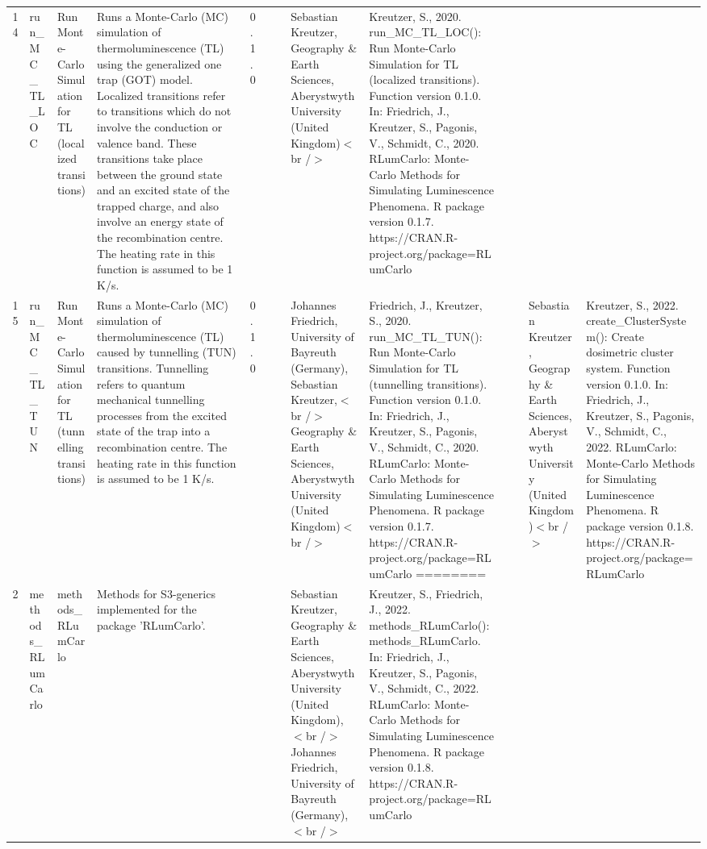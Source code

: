 \begin{table}[ht]
\begin{tabular}{rllllllll}
 \\ 
  14 & run\_MC\_TL\_LOC & Run Monte-Carlo Simulation for TL (localized transitions) & Runs a Monte-Carlo (MC) simulation of thermoluminescence (TL) using the generalized one trap (GOT) model. Localized transitions refer to transitions which do not involve the conduction or valence band. These transitions take place between the ground state and an excited state of the trapped charge, and also involve an energy state of the recombination centre. The heating rate in this function is assumed to be 1 K/s. & 0.1.0
 &  &  & Sebastian Kreutzer, Geography \& Earth Sciences, Aberystwyth University (United Kingdom)$<$br /$>$ & Kreutzer, S., 2020. run\_MC\_TL\_LOC(): Run Monte-Carlo Simulation for TL (localized transitions). Function version 0.1.0. In: Friedrich, J., Kreutzer, S., Pagonis, V., Schmidt, C., 2020. RLumCarlo: Monte-Carlo Methods for Simulating Luminescence Phenomena. R package version 0.1.7. https://CRAN.R-project.org/package=RLumCarlo
 \\ 
  15 & run\_MC\_TL\_TUN & Run Monte-Carlo Simulation for TL (tunnelling transitions) & Runs a Monte-Carlo (MC) simulation of thermoluminescence (TL) caused by tunnelling (TUN) transitions. Tunnelling refers to quantum mechanical tunnelling processes from the excited state of the trap into a recombination centre. The heating rate in this function is assumed to be 1 K/s. & 0.1.0
 &  &  & Johannes Friedrich, University of Bayreuth (Germany), Sebastian Kreutzer,$<$br /$>$ Geography \& Earth Sciences, Aberystwyth University (United Kingdom)$<$br /$>$ & Friedrich, J., Kreutzer, S., 2020. run\_MC\_TL\_TUN(): Run Monte-Carlo Simulation for TL (tunnelling transitions). Function version 0.1.0. In: Friedrich, J., Kreutzer, S., Pagonis, V., Schmidt, C., 2020. RLumCarlo: Monte-Carlo Methods for Simulating Luminescence Phenomena. R package version 0.1.7. https://CRAN.R-project.org/package=RLumCarlo
========
 &  &  & Sebastian Kreutzer, Geography \& Earth Sciences, Aberystwyth University (United Kingdom)$<$br /$>$ & Kreutzer, S., 2022. create\_ClusterSystem(): Create dosimetric cluster system. Function version 0.1.0. In: Friedrich, J., Kreutzer, S., Pagonis, V., Schmidt, C., 2022. RLumCarlo: Monte-Carlo Methods for Simulating Luminescence Phenomena. R package version 0.1.8. https://CRAN.R-project.org/package=RLumCarlo
 \\ 
  2 & methods\_RLumCarlo & methods\_RLumCarlo & Methods for S3-generics implemented for the package 'RLumCarlo'. &  &  &  & Sebastian Kreutzer, Geography \& Earth Sciences, Aberystwyth University (United Kingdom),$<$br /$>$ Johannes Friedrich, University of Bayreuth (Germany),$<$br /$>$ & Kreutzer, S., Friedrich, J., 2022. methods\_RLumCarlo(): methods\_RLumCarlo. In: Friedrich, J., Kreutzer, S., Pagonis, V., Schmidt, C., 2022. RLumCarlo: Monte-Carlo Methods for Simulating Luminescence Phenomena. R package version 0.1.8. https://CRAN.R-project.org/package=RLumCarlo

\end{tabular}
\end{table}
